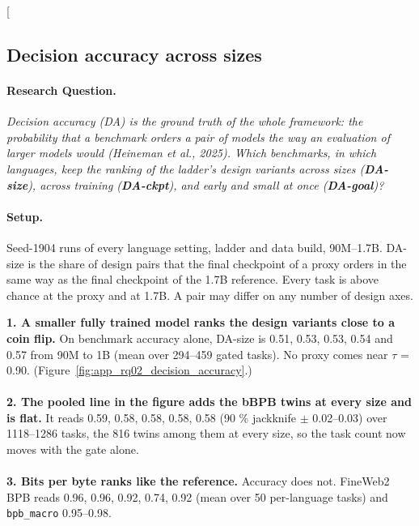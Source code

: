 \clearpage
\twocolumn[{%
\subsection{Decision accuracy across sizes}
\label{app:rq02_decision_accuracy}

\noindent\begin{minipage}[t]{0.485\textwidth}
\vspace{0pt}
\paragraph{Research Question.} \emph{Decision accuracy (DA) is the ground truth of the whole framework: the probability that a benchmark orders a pair of models the way an evaluation of larger models would (Heineman et al., 2025). Which benchmarks, in which languages, keep the ranking of the ladder's design variants across sizes (\textbf{DA-size}), across training (\textbf{DA-ckpt}), and early \emph{and} small at once (\textbf{DA-goal})?}

\paragraph{Setup.} Seed-1904 runs of every language setting, ladder and data build, 90M--1.7B. DA-size is the share of design pairs that the final checkpoint of a proxy orders in the same way as the final checkpoint of the 1.7B reference. Every task is above chance at the proxy and at 1.7B. A pair may differ on any number of design axes.
\end{minipage}\hfill
\begin{minipage}[t]{0.485\textwidth}
\vspace{0pt}
\begin{rqfinding}
\textbf{1. A smaller fully trained model ranks the design variants close to a coin flip.} On benchmark accuracy alone, DA-size is 0.51, 0.53, 0.53, 0.54 and 0.57 from 90M to 1B (mean over 294--459 gated tasks). No proxy comes near $\tau$ = 0.90. (Figure~\ref{fig:app_rq02_decision_accuracy}.)
\\
\\
\textbf{2. The pooled line in the figure adds the bBPB twins at every size and is flat.} It reads 0.59, 0.58, 0.58, 0.58, 0.58 (90 \% jackknife $\pm$ 0.02--0.03) over 1118--1286 tasks, the 816 twins among them at every size, so the task count now moves with the gate alone.
\\
\\
\textbf{3. Bits per byte ranks like the reference.} Accuracy does not. FineWeb2 BPB reads 0.96, 0.96, 0.92, 0.74, 0.92 (mean over 50 per-language tasks) and \texttt{bpb\_macro} 0.95--0.98.
\end{rqfinding}
\end{minipage}

}
